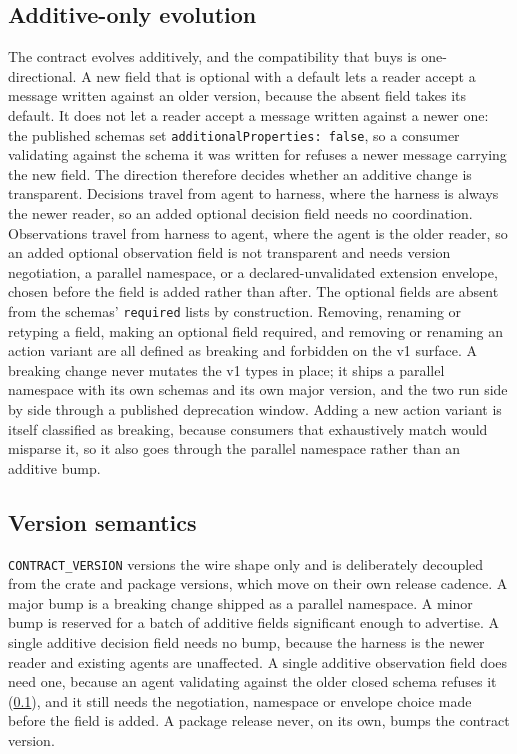 \subsection{Additive-only evolution}\label{sec:contract-evolution}

The contract evolves additively, and the compatibility that buys is one-directional. A new field that is optional with a default lets a reader accept a message written against an older version, because the absent field takes its default. It does not let a reader accept a message written against a newer one: the published schemas set \texttt{additionalProperties: false}, so a consumer validating against the schema it was written for refuses a newer message carrying the new field. The direction therefore decides whether an additive change is transparent. Decisions travel from agent to harness, where the harness is always the newer reader, so an added optional decision field needs no coordination. Observations travel from harness to agent, where the agent is the older reader, so an added optional observation field is not transparent and needs version negotiation, a parallel namespace, or a declared-unvalidated extension envelope, chosen before the field is added rather than after. The optional fields are absent from the schemas' \texttt{required} lists by construction. Removing, renaming or retyping a field, making an optional field required, and removing or renaming an action variant are all defined as breaking and forbidden on the v1 surface. A breaking change never mutates the v1 types in place; it ships a parallel namespace with its own schemas and its own major version, and the two run side by side through a published deprecation window. Adding a new action variant is itself classified as breaking, because consumers that exhaustively match would misparse it, so it also goes through the parallel namespace rather than an additive bump.

\subsection{Version semantics}\label{sec:contract-versions}

\texttt{CONTRACT\_VERSION} versions the wire shape only and is deliberately decoupled from the crate and package versions, which move on their own release cadence. A major bump is a breaking change shipped as a parallel namespace. A minor bump is reserved for a batch of additive fields significant enough to advertise. A single additive decision field needs no bump, because the harness is the newer reader and existing agents are unaffected. A single additive observation field does need one, because an agent validating against the older closed schema refuses it (\cref{sec:contract-evolution}), and it still needs the negotiation, namespace or envelope choice made before the field is added. A package release never, on its own, bumps the contract version.

